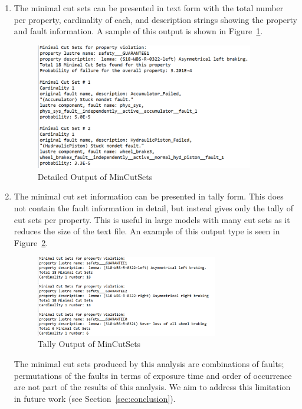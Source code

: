 \begin{enumerate}
\item The minimal cut sets can be presented in text form with the total number per property, cardinality of each, and description strings showing the property and fault information. A sample of this output is shown in Figure~\ref{fig:detailedMCS}. 

\begin{figure}[h!]
	\begin{centering}
		\includegraphics[width=0.9\textwidth]{images/mcs_detailed.png}
	\caption{Detailed Output of MinCutSets}
		\label{fig:detailedMCS}
	\end{centering}
\end{figure}

\item The minimal cut set information can be presented in tally form. This does not contain the fault information in detail, but instead gives only the tally of cut sets per property. This is useful in large models with many cut sets as it reduces the size of the text file. An example of this output type is seen in Figure~\ref{fig:tallyMCS}.

\begin{figure}[h!]
	\begin{centering}
		\includegraphics[width=0.75\textwidth]{images/mcs_tally.png}
	\caption{Tally Output of MinCutSets}
		\label{fig:tallyMCS}
	\end{centering}
\end{figure}

The minimal cut sets produced by this analysis are combinations of faults; permutations of the faults in terms of exposure time and order of occurrence are not part of the results of this analysis. We aim to address this limitation in future work (see Section~\ref{sec:conclusion}).


\end{enumerate}

